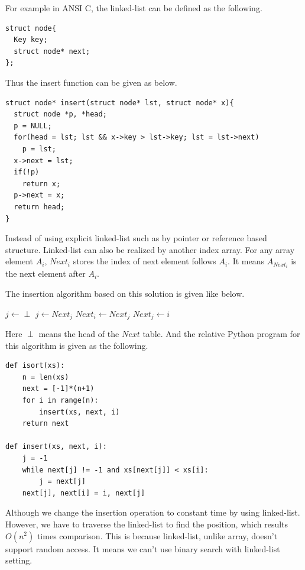 \documentclass[UTF8]{article}
\begin{document}
For example in ANSI C, the linked-list can be defined as the following.

\lstset{language=C}
\begin{lstlisting}
struct node{
  Key key;
  struct node* next;
};
\end{lstlisting}

Thus the insert function can be given as below.

\begin{lstlisting}
struct node* insert(struct node* lst, struct node* x){
  struct node *p, *head;
  p = NULL;
  for(head = lst; lst && x->key > lst->key; lst = lst->next)
    p = lst;
  x->next = lst;
  if(!p)
    return x;
  p->next = x;
  return head;
}
\end{lstlisting}

Instead of using explicit linked-list such as by pointer or reference
based structure. Linked-list can also be realized by another index array.
For any array element $A_i$, $Next_i$ stores the index of next element
follows $A_i$. It means $A_{Next_i}$ is the next element after $A_i$.

The insertion algorithm based on this solution is given like below.

\begin{algorithmic}
  \State $j \gets \perp$
    \State $j \gets Next_j$
  \EndWhile
  \State $Next_i \gets Next_j$
  \State $Next_j \gets i$
\EndFunction
\end{algorithmic}

Here $\perp$ means the head of the $Next$ table.
And the relative Python program for this algorithm is given as the following.

\lstset{language=Python}
\begin{lstlisting}
def isort(xs):
    n = len(xs)
    next = [-1]*(n+1)
    for i in range(n):
        insert(xs, next, i)
    return next

def insert(xs, next, i):
    j = -1
    while next[j] != -1 and xs[next[j]] < xs[i]:
        j = next[j]
    next[j], next[i] = i, next[j]
\end{lstlisting}

Although we change the insertion operation to constant time by using
linked-list. However, we have to traverse the linked-list to find the
position, which results $O(n^2)$ times comparison. This is because
linked-list, unlike array, doesn't support random access. It means we
can't use binary search with linked-list setting.
\end{document}
